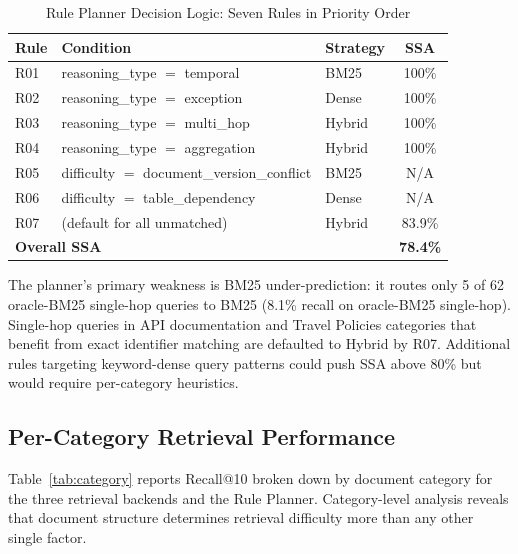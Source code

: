 \documentclass[11pt, a4paper]{article}
\begin{document}
\begin{table}[htbp]
\centering
\caption{Rule Planner Decision Logic: Seven Rules in Priority Order}
\label{tab:rules}
\begin{tabular}{lllc}
\toprule
\textbf{Rule} & \textbf{Condition} & \textbf{Strategy} & \textbf{SSA} \\
\midrule
R01 & reasoning\_type $=$ temporal          & BM25   & 100\% \\
R02 & reasoning\_type $=$ exception         & Dense  & 100\% \\
R03 & reasoning\_type $=$ multi\_hop        & Hybrid & 100\% \\
R04 & reasoning\_type $=$ aggregation       & Hybrid & 100\% \\
R05 & difficulty $=$ document\_version\_conflict & BM25 & N/A \\
R06 & difficulty $=$ table\_dependency      & Dense  & N/A  \\
R07 & (default for all unmatched)           & Hybrid & 83.9\% \\
\midrule
\multicolumn{3}{l}{\textbf{Overall SSA}} & \textbf{78.4\%} \\
\bottomrule
\end{tabular}
\end{table}

The planner's primary weakness is BM25 under-prediction: it routes only 5 of 62 oracle-BM25 single-hop queries to BM25 (8.1\% recall on oracle-BM25 single-hop). Single-hop queries in API documentation and Travel Policies categories that benefit from exact identifier matching are defaulted to Hybrid by R07. Additional rules targeting keyword-dense query patterns could push SSA above 80\% but would require per-category heuristics.

\subsection{Per-Category Retrieval Performance}

Table~\ref{tab:category} reports Recall@10 broken down by document category for the three retrieval backends and the Rule Planner. Category-level analysis reveals that document structure determines retrieval difficulty more than any other single factor.
\end{document}
